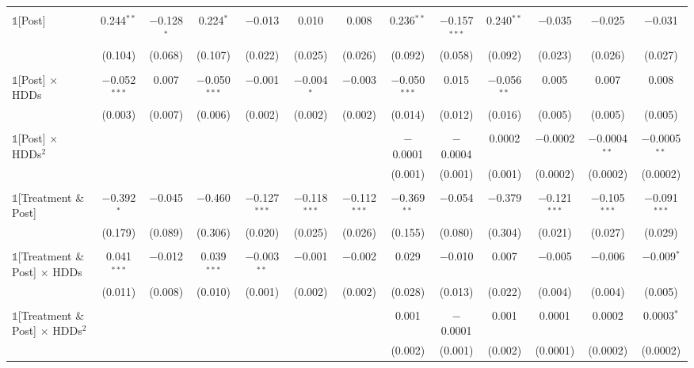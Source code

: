 \begin{table}[!htbp]
\begin{tabular}{@{\extracolsep{20pt}}lcccccccccccc}
  & & & & & & & & & & & & \\ 
 $\mathbb{1}$[Post] & 0.244$^{**}$ & $-$0.128$^{*}$ & 0.224$^{*}$ & $-$0.013 & 0.010 & 0.008 & 0.236$^{**}$ & $-$0.157$^{***}$ & 0.240$^{**}$ & $-$0.035 & $-$0.025 & $-$0.031 \\ 
  & (0.104) & (0.068) & (0.107) & (0.022) & (0.025) & (0.026) & (0.092) & (0.058) & (0.092) & (0.023) & (0.026) & (0.027) \\ 
  & & & & & & & & & & & & \\ 
 $\mathbb{1}$[Post] $\times$ HDDs & $-$0.052$^{***}$ & 0.007 & $-$0.050$^{***}$ & $-$0.001 & $-$0.004$^{*}$ & $-$0.003 & $-$0.050$^{***}$ & 0.015 & $-$0.056$^{**}$ & 0.005 & 0.007 & 0.008 \\ 
  & (0.003) & (0.007) & (0.006) & (0.002) & (0.002) & (0.002) & (0.014) & (0.012) & (0.016) & (0.005) & (0.005) & (0.005) \\ 
  & & & & & & & & & & & & \\ 
 $\mathbb{1}$[Post] $\times$ HDDs$^{2}$ &  &  &  &  &  &  & $-$0.0001 & $-$0.0004 & 0.0002 & $-$0.0002 & $-$0.0004$^{**}$ & $-$0.0005$^{**}$ \\ 
  &  &  &  &  &  &  & (0.001) & (0.001) & (0.001) & (0.0002) & (0.0002) & (0.0002) \\ 
  & & & & & & & & & & & & \\ 
 $\mathbb{1}$[Treatment \& Post] & $-$0.392$^{*}$ & $-$0.045 & $-$0.460 & $-$0.127$^{***}$ & $-$0.118$^{***}$ & $-$0.112$^{***}$ & $-$0.369$^{**}$ & $-$0.054 & $-$0.379 & $-$0.121$^{***}$ & $-$0.105$^{***}$ & $-$0.091$^{***}$ \\ 
  & (0.179) & (0.089) & (0.306) & (0.020) & (0.025) & (0.026) & (0.155) & (0.080) & (0.304) & (0.021) & (0.027) & (0.029) \\ 
  & & & & & & & & & & & & \\ 
 $\mathbb{1}$[Treatment \& Post] $\times$ HDDs & 0.041$^{***}$ & $-$0.012 & 0.039$^{***}$ & $-$0.003$^{**}$ & $-$0.001 & $-$0.002 & 0.029 & $-$0.010 & 0.007 & $-$0.005 & $-$0.006 & $-$0.009$^{*}$ \\ 
  & (0.011) & (0.008) & (0.010) & (0.001) & (0.002) & (0.002) & (0.028) & (0.013) & (0.022) & (0.004) & (0.004) & (0.005) \\ 
  & & & & & & & & & & & & \\ 
 $\mathbb{1}$[Treatment \& Post] $\times$ HDDs$^{2}$ &  &  &  &  &  &  & 0.001 & $-$0.0001 & 0.001 & 0.0001 & 0.0002 & 0.0003$^{*}$ \\ 
  &  &  &  &  &  &  & (0.002) & (0.001) & (0.002) & (0.0001) & (0.0002) & (0.0002) \\ 

\end{tabular}
\end{table}

